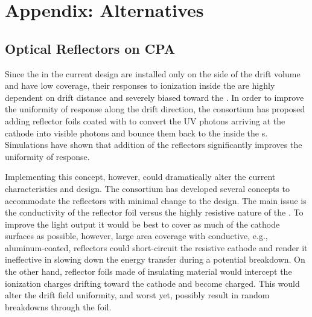 
\section{Appendix: Alternatives}

\subsection{Optical Reflectors on CPA}

Since the  in the current  design are installed only on the  side of the drift volume and have low coverage, their responses to ionization inside the  are highly dependent on drift distance and severely biased toward the .  In order to improve the uniformity of response along the drift direction, the  consortium has proposed adding reflector foils coated with   to convert the UV photons arriving at the cathode into visible photons and bounce them back to the  inside the s.  Simulations have shown that addition of the reflectors  significantly improves the uniformity of response.

Implementing this concept, however, could dramatically alter the current  characteristics and design.  The  consortium has %
developed several concepts to accommodate the reflectors with minimal change to the %
 design.  The main issue %
is the conductivity of the reflector foil versus the highly resistive nature of the .  To improve the light output it would be best to %
cover as much of the cathode surfaces as possible, however, %
large area coverage with conductive, e.g., aluminum-coated, reflectors could short-circuit the resistive cathode and render it ineffective in slowing down the energy transfer during a potential  breakdown.  On the other hand, %
reflector foils made of insulating material would intercept the ionization charges drifting toward the cathode and become charged. This would alter the drift field uniformity, and worst yet, possibly result in random breakdowns through the foil.

